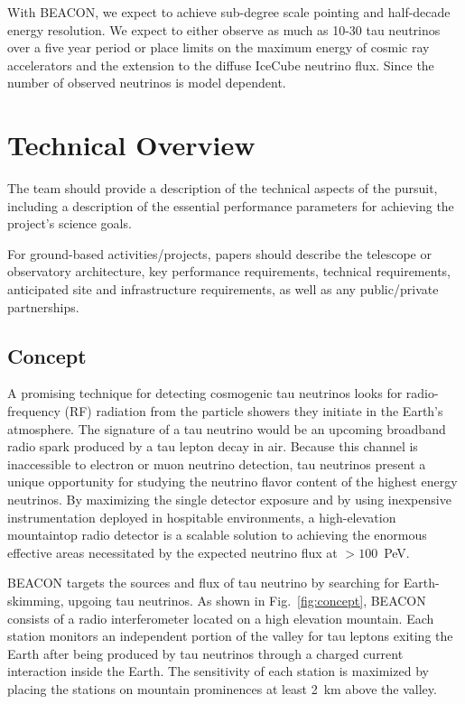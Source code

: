 \documentclass[12pt]{article}
\begin{document}
With BEACON, we expect to achieve sub-degree scale pointing and half-decade energy resolution. We expect to either observe as much as 10-30 tau neutrinos over a five year period or place limits on the maximum energy of cosmic ray accelerators and the extension to the diffuse IceCube neutrino flux.  Since the number of observed neutrinos is model dependent. 

\section{Technical Overview}
\color{blue}
The team should provide a description of the technical aspects of the pursuit, including a description of the essential performance parameters for achieving the project's science goals.

For ground-based activities/projects, papers should describe the telescope or observatory architecture, key performance requirements, technical requirements, anticipated site and infrastructure requirements, as well as any public/private partnerships.
\color{black}

\subsection{Concept}
A promising technique for detecting cosmogenic tau neutrinos looks for radio-frequency (RF) radiation from the particle showers they initiate in the Earth's atmosphere. The signature of a tau neutrino would be an upcoming broadband radio spark produced by a tau lepton decay in air. Because this channel is inaccessible to electron or muon neutrino detection, tau neutrinos present a unique opportunity for studying the neutrino flavor content of the highest energy neutrinos. By maximizing the single detector exposure and by using inexpensive instrumentation deployed in hospitable environments, a high-elevation mountaintop radio detector is a scalable solution to achieving the enormous effective areas necessitated by the expected neutrino flux at $>100$~PeV. 

BEACON targets the sources and flux of tau neutrino by searching for Earth-skimming, upgoing tau neutrinos. As shown in Fig.~\ref{fig:concept}, BEACON consists of a radio interferometer located on a high elevation mountain. Each station monitors an independent portion of the valley for tau leptons exiting the Earth after being produced by tau neutrinos through a charged current interaction inside the Earth. The sensitivity of each station is maximized by placing the stations on mountain prominences at least 2~km above the valley. 
\end{document}
